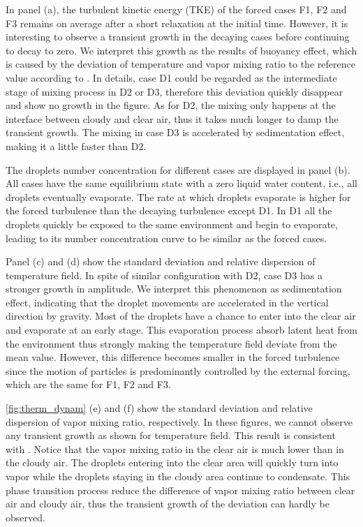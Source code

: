 In panel (a), the turbulent kinetic energy (TKE) of the forced cases F1, F2 and
F3 remains on average after a short relaxation at the initial time. However, it
is interesting to observe a transient growth in the decaying cases before
continuing to decay to zero. We interpret this growth as the results of
buoyancy effect, which is caused by the deviation of temperature and vapor
mixing ratio to the reference value according to . In
details, case D1 could be regarded as the intermediate stage of mixing process
in D2 or D3, therefore this deviation quickly disappear and show no growth in
the figure. As for D2, the mixing only happens at the interface between cloudy
and clear air, thus it takes much longer to damp the transient growth. The
mixing in case D3 is accelerated by sedimentation effect, making it a little
faster than D2.

The droplets number concentration for different cases are displayed in panel
(b). All cases have the same equilibrium state with a zero liquid water
content, i.e., all droplets eventually evaporate. The rate at which droplets
evaporate is higher for the forced turbulence than the decaying turbulence
except D1. In D1 all the droplets quickly be exposed to the same environment
and begin to evaporate, leading to its number concentration curve to be similar
as the forced cases.

Panel (c) and (d) show the standard deviation and relative dispersion of
temperature field. In spite of similar configuration with D2, case D3 has a
stronger growth in amplitude. We interpret this phenomenon as sedimentation
effect, indicating that the droplet movements are accelerated in the vertical
direction by gravity. Most of the droplets have a chance to enter into the
clear air and evaporate at an early stage. This evaporation process absorb
latent heat from the environment thus strongly making the temperature field
deviate from the mean value. However, this difference becomes smaller in the
forced turbulence since the motion of particles is predominantly controlled by
the external forcing, which are the same for F1, F2 and F3.

\ref{fig:therm_dynam} (e) and (f) show the standard deviation and relative
dispersion of vapor mixing ratio, respectively. In these figures, we cannot
observe any transient growth as shown for temperature field. This result is
consistent with \cite{Kumar2014Lagrangian}. Notice that the vapor mixing ratio in the clear
air is much lower than in the cloudy air. The droplets entering into the clear
area will quickly turn into vapor while the droplets staying in the cloudy area
continue to condensate. This phase transition process reduce the difference of
vapor mixing ratio between clear air and cloudy air, thus the transient growth
of the deviation can hardly be observed.

